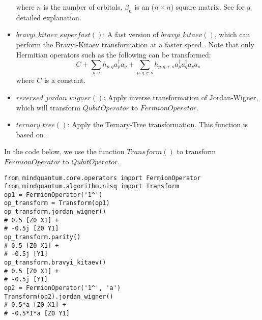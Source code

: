 \begin{itemize}
          where $n$ is the number of orbitals, $\beta_n$ is an ($n \times n$) square matrix. See \cite{seeley2012bravyi} for a detailed explanation.
    \item $bravyi\_kitaev\_superfast()$: A fast version of $bravyi\_kitaev()$, which can perform the Bravyi-Kitaev transformation at a faster speed \cite{setia2018bravyi}. Note that only Hermitian operators such as the following can be transformed:
          \begin{equation}
              C + \sum_{p,q} h_{p,q} a_p^{\dagger} a_q + \sum_{p,q,r,s} h_{p,q,r,s} a_p^{\dagger} a_q^{\dagger} a_r a_s
          \end{equation}
          where $C$ is a constant.
    \item $reversed\_jordan\_wigner()$: Apply inverse transformation of Jordan-Wigner, which will transform $QubitOperator$ to $FermionOperator$.
    \item $ternary\_tree()$: Apply the Ternary-Tree transformation. This function is based on \cite{jiang2020optimal}.
\end{itemize}
In the code below, we use the function $Transform()$ to transform $FermionOperator$ to $QubitOperator$.
\begin{lstlisting}
from mindquantum.core.operators import FermionOperator
from mindquantum.algorithm.nisq import Transform
op1 = FermionOperator('1^')
op_transform = Transform(op1)
op_transform.jordan_wigner()
# 0.5 [Z0 X1] +
# -0.5j [Z0 Y1]
op_transform.parity()
# 0.5 [Z0 X1] +
# -0.5j [Y1]
op_transform.bravyi_kitaev()
# 0.5 [Z0 X1] +
# -0.5j [Y1]
op2 = FermionOperator('1^', 'a')
Transform(op2).jordan_wigner()
# 0.5*a [Z0 X1] +
# -0.5*I*a [Z0 Y1]
\end{lstlisting}